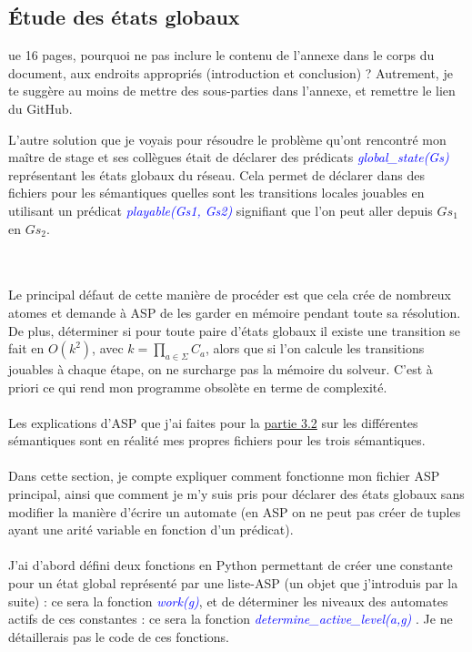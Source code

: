 \documentclass[10pt,a4paper]{article}
\begin{document}
\subsection{\'Etude des états globaux}ue 16 pages, pourquoi ne pas inclure le contenu de l'annexe dans le corps du document, aux endroits appropriés (introduction et conclusion) ? Autrement, je te suggère au moins de mettre des sous-parties dans l'annexe, et remettre le lien du GitHub.


\hypertarget{partie4.4}{
L'autre solution que je voyais pour résoudre le problème qu'ont rencontré mon maître de stage et ses collègues était de déclarer des prédicats \emph{\textcolor{blue}{global\_state(Gs)}} représentant les états globaux du réseau. 
Cela permet de déclarer dans des fichiers pour les sémantiques quelles sont les transitions locales jouables en utilisant un prédicat \emph{\textcolor{blue}{playable(Gs1, Gs2)}} signifiant que l'on peut aller depuis 
$Gs_1$ en $Gs_2$.}\\ \\
Le principal défaut de cette manière de procéder est que cela crée de nombreux atomes et demande à ASP de les garder en mémoire pendant toute sa résolution. De plus, déterminer si pour toute paire d'états globaux il existe une 
transition se fait en $O(k^2)$, avec $k=\displaystyle{\prod_{a\in\Sigma}C_a}$, alors que si l'on calcule les transitions jouables à chaque étape, on ne surcharge pas la mémoire du solveur. C'est à priori ce qui rend mon programme 
obsolète en terme de complexité.\\ \\
Les explications d'ASP que j'ai faites pour la \hyperlink{semantiques}{partie 3.2} sur les différentes sémantiques sont en réalité mes propres fichiers pour les trois sémantiques.\\ \\
Dans cette section, je compte expliquer comment fonctionne mon fichier ASP principal, ainsi que comment je m'y suis pris pour déclarer des états globaux sans modifier la manière d'écrire un automate (en ASP on ne peut pas créer 
de tuples ayant une arité variable en fonction d'un prédicat).\\ \\
J'ai d'abord défini deux fonctions en Python permettant de créer une constante pour un état global représenté par une liste-ASP (un objet que j'introduis par la suite) : ce sera la fonction \emph{\textcolor{blue}{work(g)}}, et de 
déterminer les niveaux des automates actifs de ces constantes : ce sera la fonction \emph{\textcolor{blue}{determine\_active\_level(a,g)}} . Je ne détaillerais pas le code de ces fonctions.\\
\end{document}
